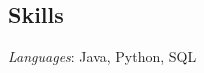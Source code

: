 \documentclass[margin,line]{resume}
\begin{document}
\begin{resume}
\vspace{1mm}

\section{\mysidestyle Skills}
\emph{Languages}: Java, Python, SQL

\end{resume}
\end{document}
